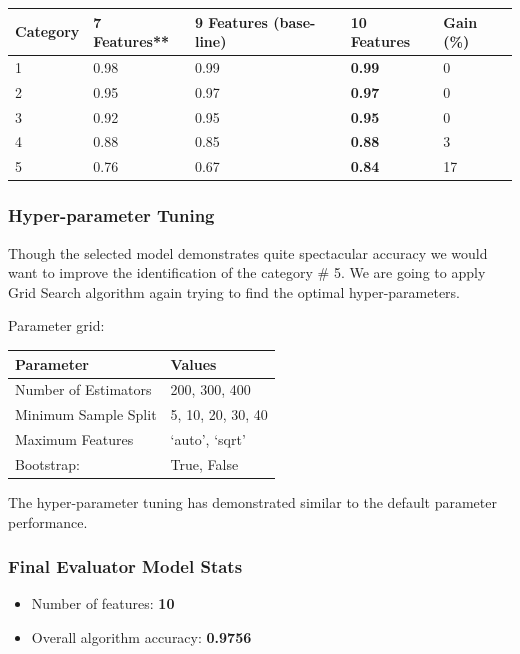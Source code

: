 \begin{longtable}[]{@{}lllll@{}}
\toprule
Category & 7 Features** & 9 Features (base-line) & \textbf{10 Features}
& Gain (\%)\tabularnewline
\midrule
\endhead
1 & 0.98 & 0.99 & \textbf{0.99} & 0\tabularnewline
2 & 0.95 & 0.97 & \textbf{0.97} & 0\tabularnewline
3 & 0.92 & 0.95 & \textbf{0.95} & 0\tabularnewline
4 & 0.88 & 0.85 & \textbf{0.88} & 3\tabularnewline
5 & 0.76 & 0.67 & \textbf{0.84} & 17\tabularnewline
\bottomrule
\end{longtable}

\hypertarget{hyper-parameter-tuning-1}{%
\subsubsection{Hyper-parameter Tuning}\label{hyper-parameter-tuning-1}}

Though the selected model demonstrates quite spectacular accuracy we
would want to improve the identification of the category \# 5. We are
going to apply Grid Search algorithm again trying to find the optimal
hyper-parameters.

Parameter grid:

\begin{longtable}[]{@{}ll@{}}
\toprule
Parameter & Values\tabularnewline
\midrule
\endhead
Number of Estimators & 200, 300, 400\tabularnewline
Minimum Sample Split & 5, 10, 20, 30, 40\tabularnewline
Maximum Features & `auto', `sqrt'\tabularnewline
Bootstrap: & True, False\tabularnewline
\bottomrule
\end{longtable}

The hyper-parameter tuning has demonstrated similar to the default
parameter performance.

\hypertarget{final-evaluator-model-stats}{%
\subsubsection{Final Evaluator Model
Stats}\label{final-evaluator-model-stats}}

\begin{itemize}
\tightlist
\item
  Number of features: \textbf{10}
\item
  Overall algorithm accuracy: \textbf{0.9756}
\end{itemize}

